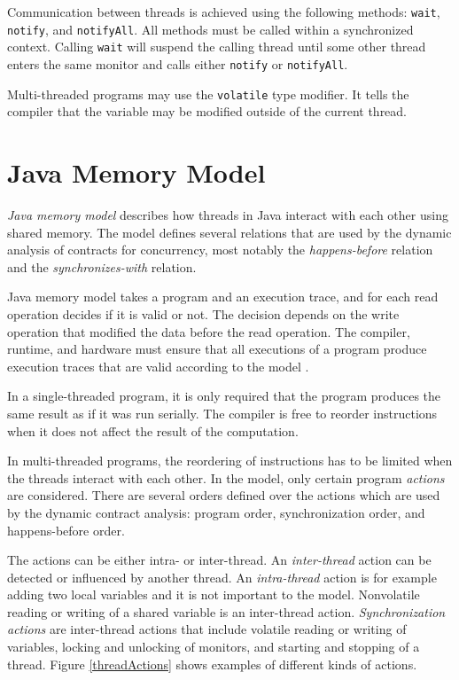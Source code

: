 Communication between threads is achieved using the following methods:
\texttt{wait}, \texttt{notify}, and \texttt{notifyAll}. All methods must be
called within a synchronized context. Calling \texttt{wait} will suspend the
calling thread until some other thread enters the same monitor and calls either
\texttt{notify} or \texttt{notifyAll}.

Multi-threaded programs may use the \texttt{volatile} type modifier. It tells
the compiler that the variable may be modified outside of the current thread.

\section{Java Memory Model}


\emph{Java memory model} describes how threads in Java interact with each other
using shared memory. The model defines several relations that are used by the
dynamic analysis of contracts for concurrency, most notably the
\emph{happens-before} relation and the \emph{synchronizes-with} relation.

Java memory model takes a program and an execution trace, and for each read
operation decides if it is valid or not. The decision depends on the write
operation that modified the data before the read operation. The compiler,
runtime, and hardware must ensure that all executions of a program produce
execution traces that are valid according to the model \cite{jmmspec}.

In a single-threaded program, it is only required that the program produces the
same result as if it was run serially. The compiler is free to reorder
instructions when it does not affect the result of the computation.

In multi-threaded programs, the reordering of instructions has to be limited
when the threads interact with each other. In the model, only certain program
\emph{actions} are considered. There are several orders defined over the actions
which are used by the dynamic contract analysis: program order, synchronization
order, and happens-before order.

The actions can be either intra- or inter-thread. An \emph{inter-thread} action
can be detected or influenced by another thread. An \emph{intra-thread} action
is for example adding two local variables and it is not important to the model.
Nonvolatile reading or writing of a shared variable is an inter-thread action.
\emph{Synchronization actions} are inter-thread actions that include volatile
reading or writing of variables, locking and unlocking of monitors, and starting
and stopping of a thread. Figure \ref{threadActions} shows examples of different
kinds of actions.

